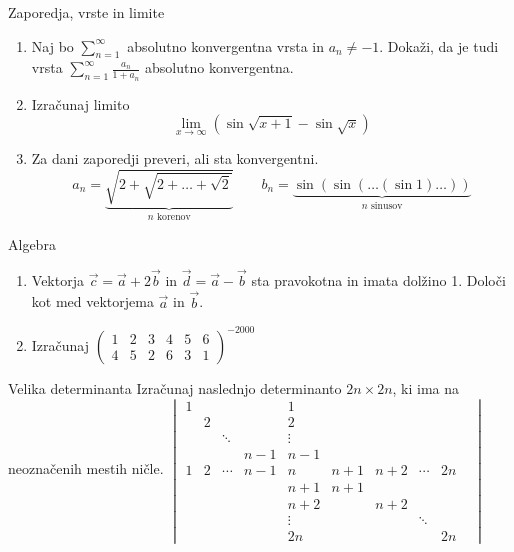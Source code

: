 \begin{frame}{Zaporedja, vrste in limite}
	\begin{enumerate}
		\item 
		Naj bo $\sum_{n=1}^\infty$ absolutno konvergentna vrsta in $a_n \ne -1$.
		Dokaži, da je tudi vrsta $\sum_{n=1}^\infty \frac{a_n}{1+a_n}$
		absolutno konvergentna.

		\item
		Izračunaj limito
		\[\lim_{x\to\infty} (\sin\sqrt{x+1}-\sin\sqrt{x})\]

		\item
		Za dani zaporedji preveri, ali sta konvergentni.
		\[a_n = \underbrace{\sqrt{2+\sqrt{2+\dots+\sqrt{2}}}}_{\text{\(n\) korenov}} \qquad
		b_n = \underbrace{\sin(\sin(\dots(\sin 1)\dots))}_{\text{\(n\) sinusov}} \]
		
	\end{enumerate}
\end{frame}

\begin{frame}{Algebra}
	\begin{enumerate}
		\item
		Vektorja \(\vec{c}=\vec{a} + 2\vec{b}\) in \(\vec{d} = \vec{a} - \vec{b}\)
		sta pravokotna in imata dolžino 1. Določi kot med vektorjema $\vec{a}$ in $\vec{b}$.
		\item 
		Izračunaj
		\(\begin{pmatrix}
		1&2&3&4&5&6\\
		4&5&2&6&3&1
		\end{pmatrix}^{-2000}\)
	\end{enumerate}
\end{frame}

\begin{frame}{Velika determinanta}
	Izračunaj naslednjo determinanto $2n \times 2n$, ki ima na neoznačenih mestih ničle.
	\(\begin{vmatrix}
	1&&&&1&&&& \\
	&2&&&2&&&& \\
	&&\ddots&&\vdots&&&& \\
	&&& n-1 & n-1 &&&& \\
	1&2&\cdots& n-1 & n & n+1 & n+2 & \cdots & 2n \\
	&&&& n+1 & n+1 & &&& \\
	&&&& n+2 & & n+2 && \\
	&&&&\vdots &&&\ddots & \\
	&&&& 2n&&&& 2n
	\end{vmatrix}\)
\end{frame}

